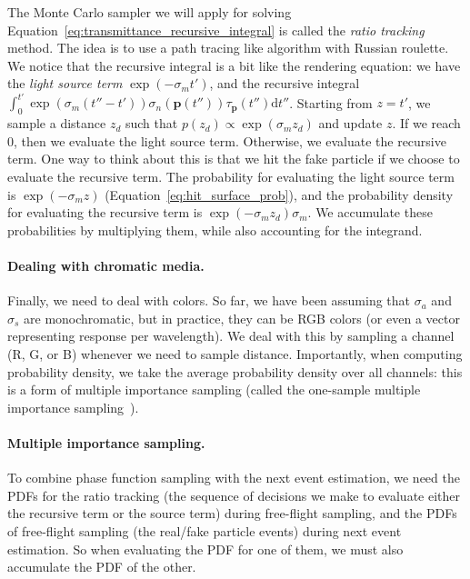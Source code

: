 The Monte Carlo sampler we will apply for solving Equation~\ref{eq:transmittance_recursive_integral} is called the \emph{ratio tracking} method. The idea is to use a path tracing like algorithm with Russian roulette. We notice that the recursive integral is a bit like the rendering equation: we have the \emph{light source term} $\exp\left(-\sigma_m t'\right)$, and the recursive integral $\int_{0}^{t'} \exp\left(\sigma_m (t''-t')\right) \sigma_n(\mathbf{p}(t'')) \tau_{\mathbf{p}}(t'') \mathrm{d}t''$. 
Starting from $z=t'$, we sample a distance $z_d$ such that $p(z_d) \propto \exp\left(\sigma_m z_d\right)$ and update $z$. If we reach 0, then we evaluate the light source term. Otherwise, we evaluate the recursive term. One way to think about this is that we hit the fake particle if we choose to evaluate the recursive term. The probability for evaluating the light source term is $\exp\left(-\sigma_m z\right)$ (Equation~\ref{eq:hit_surface_prob}), and the probability density for evaluating the recursive term is $\exp\left(-\sigma_m z_d\right) \sigma_m$. We accumulate these probabilities by multiplying them, while also accounting for the integrand.

\paragraph{Dealing with chromatic media.} Finally, we need to deal with colors. So far, we have been assuming that $\sigma_a$ and $\sigma_s$ are monochromatic, but in practice, they can be RGB colors (or even a vector representing response per wavelength). We deal with this by sampling a channel (R, G, or B) whenever we need to sample distance. Importantly, when computing probability density, we take the average probability density over all channels: this is a form of multiple importance sampling (called the one-sample multiple importance sampling~\cite{Veach:1995:OCS}).

\paragraph{Multiple importance sampling.} To combine phase function sampling with the next event estimation, we need the PDFs for the ratio tracking (the sequence of decisions we make to evaluate either the recursive term or the source term) during free-flight sampling, and the PDFs of free-flight sampling (the real/fake particle events) during next event estimation. So when evaluating the PDF for one of them, we must also accumulate the PDF of the other.

